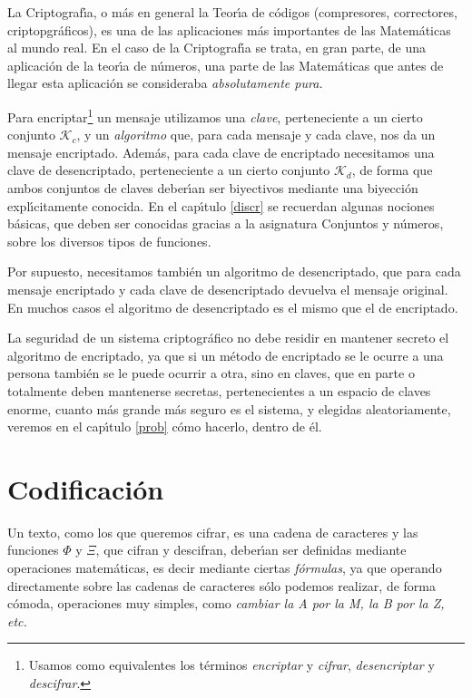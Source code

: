 
La Criptograf\'{\i}a, o m\'as en general la Teor\'{\i}a de c\'odigos 
(compresores, correctores, criptopgr\'aficos), es una de las aplicaciones m\'as 
importantes de las Matem\'aticas al mundo real.  En el caso de la 
Criptograf\'{\i}a se trata, en gran parte, de una aplicaci\'on de la 
teor\'{\i}a de n\'umeros, una parte de las Matem\'aticas que antes de llegar 
esta aplicaci\'on se consideraba {\itshape absolutamente pura.}


Para encriptar\footnote{Usamos como equivalentes los t\'erminos {\itshape encriptar} y {\itshape cifrar}, {\itshape desencriptar} y {\itshape descifrar}.} un mensaje utilizamos una {\itshape clave}, perteneciente a un cierto conjunto $\mathscr{K}_c$,  y un {\itshape algoritmo}  que,  para cada mensaje y cada clave,  nos da un mensaje encriptado. Adem\'as, para cada clave de encriptado necesitamos una clave de desencriptado, perteneciente a un cierto conjunto $\mathscr{K}_d$, de forma que ambos conjuntos de claves deber\'{\i}an ser biyectivos mediante una biyecci\'on expl\'{\i}citamente conocida. En el cap\'{\i}tulo \ref{discr} se recuerdan algunas nociones b\'asicas, que deben ser conocidas gracias a la asignatura {\sc Conjuntos y n\'umeros},  sobre los diversos tipos de funciones. 



Por supuesto, necesitamos tambi\'en un algoritmo de desencriptado, que para cada mensaje encriptado y cada clave de desencriptado devuelva el mensaje original. En muchos casos el algoritmo de desencriptado es el mismo que el de encriptado. 


La seguridad de un sistema criptogr\'afico no debe residir en mantener secreto el algoritmo de encriptado, ya que si un m\'etodo de encriptado se le ocurre a una persona tambi\'en se le puede ocurrir a otra, sino en claves, que en parte o totalmente deben mantenerse secretas, pertenecientes a un espacio de claves enorme, cuanto m\'as grande m\'as seguro es el sistema,  y elegidas aleatoriamente, veremos en el cap\'{\i}tulo \ref{prob} c\'omo hacerlo,  dentro de \'el.  



\section{Codificaci\'on}

Un texto, como los que queremos cifrar,  es una cadena de caracteres y las
funciones  $\Phi$ y $\Xi$,  que cifran y descifran, deber\'{\i}an
ser definidas mediante operaciones matem\'aticas, es decir mediante ciertas
{\itshape f\'ormulas}, ya que operando directamente sobre las cadenas de
caracteres s\'olo podemos realizar, de forma c\'omoda, operaciones muy simples, 
 como {\itshape
cambiar la A por la M, la B por la Z, etc.}



